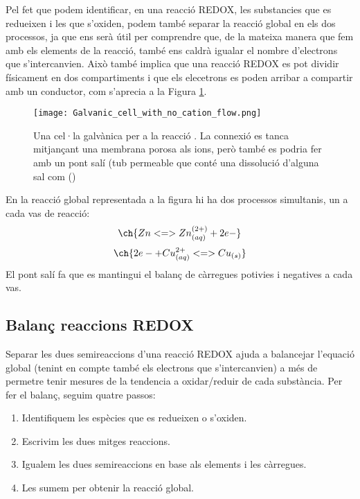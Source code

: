 Pel fet que podem identificar, en una reacció REDOX, les substancies que es redueixen i les que s'oxiden, podem també separar la reacció global en els dos processos, ja que ens serà útil per comprendre que, de la mateixa manera que fem amb els elements de la reacció, també ens caldrà igualar el nombre d'electrons que s'intercanvien. Això també implica que una reacció REDOX es pot dividir físicament en dos compartiments i que els elecetrons es poden arribar a compartir amb un conductor, com s'aprecia a la Figura \ref{fig:Galvanic_cell_with_no_cation_flow}.

\begin{figure}[h]
\centering
\texttt{[image: Galvanic\_cell\_with\_no\_cation\_flow.png]}
\caption{Una cel·la galvànica per a la reacció 
. 
La connexió es tanca mitjançant una membrana porosa als ions, però també es podria fer amb un pont salí (tub permeable que conté una dissolució d'alguna sal com  ()}
\label{fig:Galvanic_cell_with_no_cation_flow}
\end{figure}

En la reacció global representada a la figura hi ha dos processos simultanis, un a cada vas de reacció:
\[\ch{Zn <=> Zn^{(2+)}_{(aq)} + 2 e-}\]
\[\ch{2 e- + Cu^{2+}_{(aq)} <=> Cu_{(s)}}\]
El pont salí fa que es mantingui el balanç de càrregues potivies i negatives a cada vas.


\subsection{Balanç reaccions REDOX}

Separar les dues semireaccions d'una reacció REDOX ajuda a balancejar l'equació global (tenint en compte també els electrons que s'intercanvien) a més de permetre tenir mesures de la tendencia a oxidar/reduir de cada substància.
Per fer el balanç, seguim quatre passos:
\begin{enumerate}
\item Identifiquem les espècies que es redueixen o s'oxiden.
\item Escrivim les dues mitges reaccions.
\item Igualem les dues semireaccions en base als elements i les càrregues.
\item Les sumem per obtenir la reacció global.
\end{enumerate}

